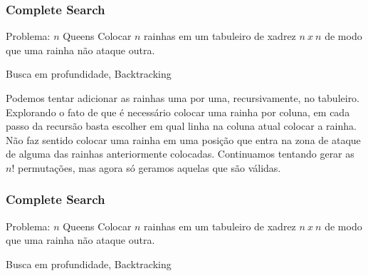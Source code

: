 \begin{frame}
\frametitle{Complete Search}
\begin{block}{Problema: $n$ Queens}
\scriptsize
Colocar $n$ rainhas em um tabuleiro de xadrez $n\ x\ n$ de modo que uma rainha não ataque outra.
\end{block}

\begin{block}{Busca em profundidade, Backtracking}
\begin{itemize}[<+->]
	\bitem Podemos tentar adicionar as rainhas uma por uma, recursivamente, no tabuleiro.
	\bitem Explorando o fato de que é necessário colocar uma rainha por coluna, em cada passo da recursão basta escolher em qual linha na coluna atual colocar a rainha.
	\bitem Não faz sentido colocar uma rainha em uma posição que entra na zona de ataque de alguma das rainhas anteriormente colocadas.
	\bitem Continuamos tentando gerar as $n!$ permutações, mas agora só geramos aquelas que são válidas. \color{ccomments}{(filtrar vs. gerar)}
\end{itemize}
\end{block}
\end{frame}

\begin{frame}
\frametitle{Complete Search}
\begin{block}{Problema: $n$ Queens}
\scriptsize
Colocar $n$ rainhas em um tabuleiro de xadrez $n\ x\ n$ de modo que uma rainha não ataque outra.
\end{block}

\begin{block}{Busca em profundidade, Backtracking}
\end{block}
\end{frame}

